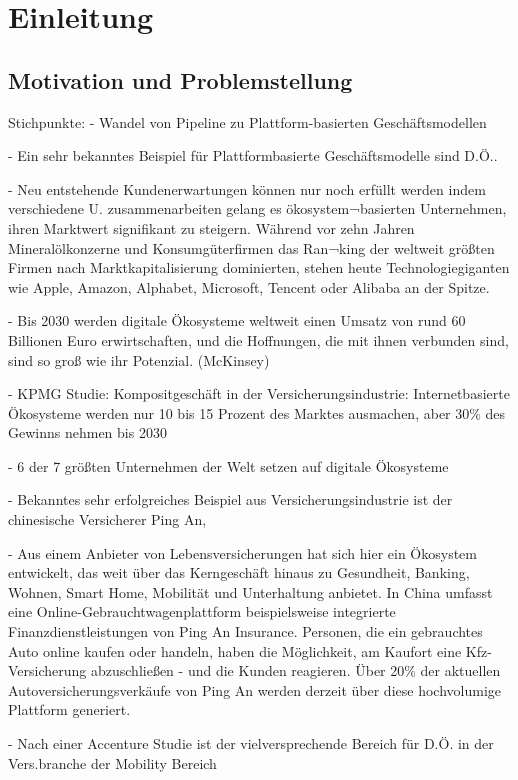 \chapter{Einleitung}

\section{Motivation und Problemstellung}

Stichpunkte:
-	Wandel von Pipeline zu Plattform-basierten Geschäftsmodellen

-	Ein sehr bekanntes Beispiel für Plattformbasierte Geschäftsmodelle sind D.Ö..

-	Neu entstehende Kundenerwartungen können nur noch erfüllt werden indem verschiedene U. zusammenarbeiten gelang es  ökosystem¬basierten  Unternehmen,  ihren  Marktwert  signifikant  zu  steigern.  Während  vor  zehn  Jahren Mineralölkonzerne und Konsumgüterfirmen das Ran¬king  der  weltweit  größten  Firmen  nach  Marktkapitalisierung  dominierten,  stehen  heute  Technologiegiganten  wie  Apple,  Amazon,  Alphabet,  Microsoft,  Tencent  oder  Alibaba  an  der  Spitze.

-	Bis 2030 werden digitale Ökosysteme weltweit einen Umsatz von rund 60 Billionen Euro erwirtschaften, und die Hoffnungen, die mit ihnen verbunden sind, sind so groß wie ihr Potenzial. (McKinsey)

-	KPMG Studie: Kompositgeschäft in der Versicherungsindustrie: Internetbasierte Ökosysteme werden nur 10 bis 15 Prozent des Marktes ausmachen, aber 30\% des Gewinns nehmen bis 2030

-	6 der 7 größten Unternehmen der Welt setzen auf digitale Ökosysteme

-	Bekanntes sehr erfolgreiches Beispiel aus Versicherungsindustrie ist der chinesische Versicherer Ping An,

-	Aus einem Anbieter von Lebensversicherungen hat sich hier ein Ökosystem entwickelt, das weit über das Kerngeschäft hinaus zu Gesundheit, Banking, Wohnen, Smart Home, Mobilität und Unterhaltung anbietet. In China umfasst eine Online-Gebrauchtwagenplattform beispielsweise integrierte Finanzdienstleistungen von Ping An Insurance. Personen, die ein gebrauchtes Auto online kaufen oder handeln, haben die Möglichkeit, am Kaufort eine Kfz-Versicherung abzuschließen - und die Kunden reagieren. Über 20\% der aktuellen Autoversicherungsverkäufe von Ping An werden derzeit über diese hochvolumige Plattform generiert.

-	Nach einer Accenture Studie ist der vielversprechende Bereich für D.Ö. in der Vers.branche der Mobility Bereich

